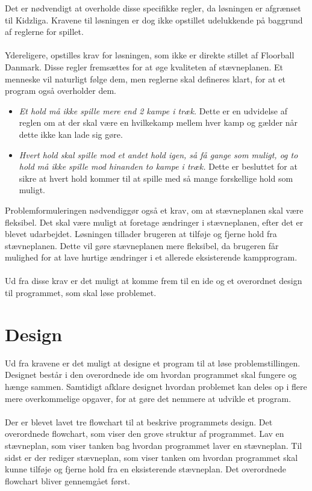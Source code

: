 Det er nødvendigt at overholde disse specifikke regler, da løsningen er afgrænset til Kidzliga. Kravene til løsningen er dog ikke opstillet udelukkende på baggrund af reglerne for spillet.
\\\\
Ydereligere, opstilles krav for løsningen, som ikke er direkte stillet af Floorball Danmark. Disse regler fremsættes for at øge kvaliteten af stævneplanen. Et menneske vil naturligt følge dem, men reglerne skal defineres klart, for at et program også overholder dem.
\begin{itemize}
    \item \textit{Et hold må ikke spille mere end 2 kampe i træk.} Dette er en udvidelse af reglen om at der skal være en hvilkekamp mellem hver kamp og gælder når dette ikke kan lade sig gøre. 
    \item \textit{Hvert hold skal spille mod et andet hold igen, så få gange som muligt, og to hold må ikke spille mod hinanden to kampe i træk.} Dette er besluttet for at sikre at hvert hold kommer til at spille med så mange forskellige hold som muligt.
\end{itemize}

Problemformuleringen nødvendiggør også et krav, om at stævneplanen skal være fleksibel. Det skal være muligt at foretage ændringer i stævneplanen, efter det er blevet udarbejdet. Løsningen tillader brugeren at tilføje og fjerne hold fra stævneplanen. Dette vil gøre stævneplanen mere fleksibel, da brugeren får mulighed for at lave hurtige ændringer i et allerede eksisterende kampprogram.
\\\\
Ud fra disse krav er det muligt at komme frem til en ide og et overordnet design til programmet, som skal løse problemet. 

\section{Design}
Ud fra kravene er det muligt at designe et program til at løse problemstillingen. Designet består i den overordnede ide om hvordan programmet skal fungere og hænge sammen. Samtidigt afklare designet hvordan problemet kan deles op i flere mere overkommelige opgaver, for at gøre det nemmere at udvikle et program. 
\\\\
Der er blevet lavet tre flowchart til at beskrive programmets design. Det overordnede flowchart, som viser den grove struktur af programmet. Lav en stævneplan, som viser tanken bag hvordan programmet laver en stævneplan. Til sidst er der rediger stævneplan, som viser tanken om hvordan programmet skal kunne tilføje og fjerne hold fra en eksisterende stævneplan. Det overordnede flowchart bliver gennemgået først.

